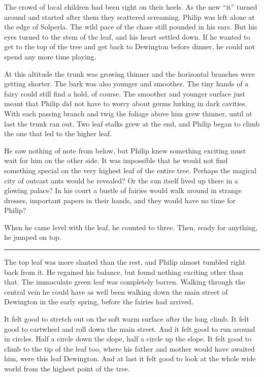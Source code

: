 \documentclass[10pt]{memoir}
\renewcommand{\pfbreakdisplay}{\bigskip \ding{166} \bigskip}
\newcommand{\secbreak}{\fancybreak{\pfbreakdisplay}}
\begin{document}
The crowd of local children had been right on their heels. As the new ``it''
turned around and started after them they scattered screaming. Philip was left
alone at the edge of Solperla. The wild pace of the chase still pounded in his
ears. But his eyes turned to the stem of the leaf, and his heart settled down.
If he wanted to get to the top of the tree and get back to Dewington before
dinner, he could not spend any more time playing.

At this altitude the trunk was growing thinner and the horizontal branches were
getting shorter. The bark was also younger and smoother. The tiny hands of a
fairy could still find a hold, of course. The smoother and younger surface just
meant that Philip did not have to worry about germs lurking in dark cavities.
With each passing branch and twig the foliage above him grew thinner, until at
last the trunk ran out. Two leaf stalks grew at the end, and Philip began to
climb the one that led to the higher leaf.

He saw nothing of note from below, but Philip knew something exciting must wait
for him on the other side. It was impossible that he would not find something
special on the very highest leaf of the entire tree. Perhaps the magical city
of outcast ants would be revealed? Or the sun itself lived up there in a
glowing palace? In his court a bustle of fairies would walk around in strange
dresses, important papers in their hands, and they would have no time for
Philip?

When he came level with the leaf, he counted to three. Then, ready for
anything, he jumped on top.

\secbreak

The top leaf was more slanted than the rest, and Philip almost tumbled right
back from it. He regained his balance, but found nothing exciting other than
that. The immaculate green leaf was completely barren. Walking through the
central vein he could have as well been walking down the main street of
Dewington in the early spring, before the fairies had arrived.

It felt good to stretch out on the soft warm surface after the long climb. It
felt good to cartwheel and roll down the main street. And it felt good to run
around in circles. Half a circle down the slope, half a circle up the slope. It
felt good to climb to the tip of the leaf too, where his father and mother
would have awaited him, were this leaf Dewington. And at last it felt good to
look at the whole wide world from the highest point of the tree.
\end{document}
